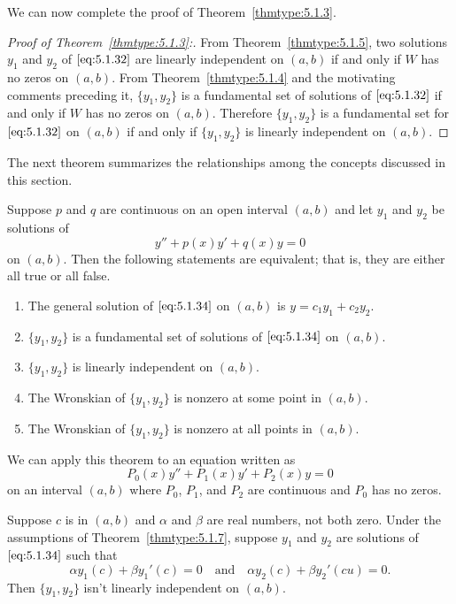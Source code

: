 \documentclass{ximera}
\begin{document}
We can now complete the proof of Theorem~\ref{thmtype:5.1.3}.
\begin{proof}[Proof of Theorem~\ref{thmtype:5.1.3}:]
From Theorem~\ref{thmtype:5.1.5}, two solutions $y_1$ and $y_2$ of
$\eqref{eq:5.1.32}$ are linearly
independent on $(a,b)$ if and only if $W$ has no zeros on $(a,b)$.
From Theorem~\ref{thmtype:5.1.4} and the motivating comments preceding
it,  $\{y_1,y_2\}$ is  a fundamental set of solutions of
$\eqref{eq:5.1.32}$  if and only if $W$ has no zeros on $(a,b)$.
Therefore  $\{y_1,y_2\}$ is a fundamental set for $\eqref{eq:5.1.32}$ on $(a,b)$ if and only if $\{y_1,y_2\}$
is linearly independent on $(a,b)$. 
\end{proof}
The next theorem summarizes the relationships among the
concepts discussed in this section.
 
\begin{theorem}\label{thmtype:5.1.6}
 Suppose  $p$ and $q$ are continuous on an open interval $(a,b)$
and  let $y_1$ and $y_2$ be solutions of
\begin{equation}\label{eq:5.1.34}
y''+p(x)y'+q(x)y=0
\end{equation}
on  $(a,b).$  Then the following statements are equivalent; that
is, they are either all true or all false.
\begin{enumerate}
\item %
The general solution of $\eqref{eq:5.1.34}$ on  $(a,b)$ is
$y=c_1y_1+c_2y_2$.
\item %
 $\{y_1,y_2\}$ is a fundamental set of solutions of $\eqref{eq:5.1.34}$
on  $(a,b).$
\item %
 $\{y_1,y_2\}$ is linearly independent on  $(a,b)$.
\item %
The Wronskian of   $\{y_1,y_2\}$ is nonzero at some point in  $(a,b)$.
\item %
The Wronskian of   $\{y_1,y_2\}$ is nonzero at all points in  $(a,b)$.
\end{enumerate}
\end{theorem}
 
We can apply this theorem to an equation written as
$$
P_0(x)y''+P_1(x)y'+P_2(x)y=0
$$
on an interval $(a,b)$ where $P_0$, $P_1$, and $P_2$
are continuous and $P_0$ has no zeros.
 
 
\begin{theorem}\label{thmtype:5.1.7}
Suppose  $c$ is in $(a,b)$ and $\alpha$ and $\beta$  are real numbers,
not both zero.
Under the assumptions of Theorem~\ref{thmtype:5.1.7}, suppose
$y_{1}$ and $y_{2}$ are  solutions  of $\eqref{eq:5.1.34}$   such that
\begin{equation} \label{eq:5.1.35}
\alpha y_{1}(c)+\beta y_{1}'(c)=0\quad\text{and}\quad
\alpha y_{2}(c)+\beta y_{2}'(c u)=0.
\end{equation}
Then $\{y_{1},y_{2}\}$ isn't  linearly independent on $(a,b)$.
\end{theorem}
 
\end{document}

